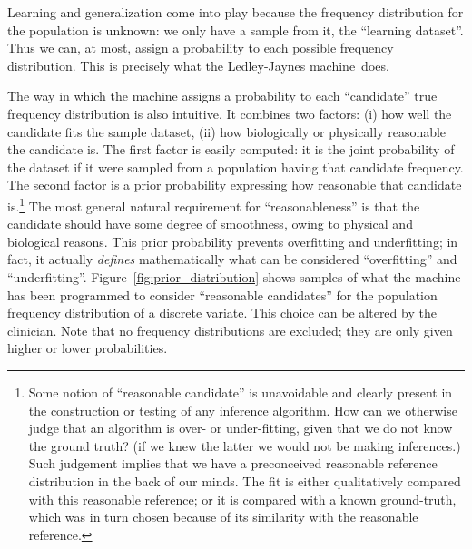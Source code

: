 \documentclass[utf8]{FrontiersinHarvard_mod} %
\renewcommand*{\|}[1][]{\nonscript\:#1\vert\nonscript\:\mathopen{}}
\newcommand*{\ljm}{Ledley-Jaynes machine}
\begin{document}
Learning and generalization come into play because the frequency distribution for the population is unknown: we only have a sample from it, the \enquote{learning dataset}. Thus we can, at most, assign a probability to each possible frequency distribution. This is precisely what the \ljm\ does.

The way in which the machine assigns a probability to each \enquote{candidate} true frequency distribution is also intuitive. It combines two factors: (i) how well the candidate fits the sample dataset, (ii) how biologically or physically reasonable the candidate is. The first factor is easily computed: it is the joint probability of the dataset if it were sampled from a population having that candidate frequency. The second factor is a prior probability expressing how reasonable that candidate is.\footnote{Some notion of \enquote{reasonable candidate} is unavoidable and clearly present in the construction or testing of any inference algorithm. How can we otherwise judge that an algorithm is over- or under-fitting, given that we do not know the ground truth? (if we knew the latter we would not be making inferences.) Such judgement implies that we have a preconceived reasonable reference distribution in the back of our minds. The fit is either qualitatively compared with this reasonable reference; or it is compared with a known ground-truth, which was in turn chosen because of its similarity with the reasonable reference.} The most general natural requirement for \enquote{reasonableness} is that the candidate should have some degree of smoothness, owing to physical and biological reasons. This prior probability prevents overfitting and underfitting; in fact, it actually \emph{defines} mathematically what can be considered \enquote{overfitting} and \enquote{underfitting}. Figure~\ref{fig:prior_distribution} shows samples of what the machine has been programmed to consider \enquote{reasonable candidates} for the population frequency distribution of a discrete variate. This choice can be altered by the clinician. Note that no frequency distributions are excluded; they are only given higher or lower probabilities.
\end{document}
